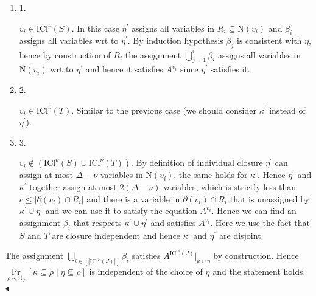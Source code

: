 \begin{enumerate}


\item[] 
1. 


$v_{i}\in\mathrm{ICl}^{\nu}\left(S\right)$. In this case $\eta^{\prime}$ assigns all variables in $R_{i}\subseteq\mathrm{N}\left(v_{i}\right)$ and $\beta_{i}$ assigns all variables wrt to $\eta^{\prime}$. By induction hypothesis
$\beta_{j}$ is consistent with $\eta$, hence by construction of $R_{i}$ the assignment
$\bigcup\limits_{j=1}^{i}\beta_{i}$ assigns all variables in $\mathrm{N}\left(v_{i}\right)$ wrt to $\eta^{\prime}$ and
hence it satisfies $A^{v_{i}}$ since $\eta^{\prime}$ satisfies it.\par





\item[] 
2. 


$v_{i}\in\mathrm{ICl}^{\nu}\left(T\right)$. Similar to the previous case (we should consider $\kappa^{\prime}$
instead of $\eta^{\prime}$).\par





\item[] 
3. 


$v_{i}\notin(\mathrm{ICl}^{\nu}\left(S\right)\cup\mathrm{ICl}^{\nu}\left(T%
\right))$. By definition of individual closure
$\eta^{\prime}$ can assign at most $\Delta-\nu$ variables in $\mathrm{N}\left(v_{i}\right)$, the same holds for
$\kappa^{\prime}$. Hence $\eta^{\prime}$ and $\kappa^{\prime}$ together assign at most $2(\Delta-\nu)$ variables,
which is strictly less than $c\leq|\partial(v_{i})\cap R_{i}|$ and there is a variable in $\partial(v_{i})\cap R_{i}$ that is unassigned
by $\kappa^{\prime}\cup\eta^{\prime}$ and we can use it to satisfy the equation $A^{v_{i}}$. Hence we can
find an assignment $\beta_{i}$ that respects $\kappa^{\prime}\cup\eta^{\prime}$ and satisfies $A^{v_{i}}$. Here
we use the fact that $S$ and $T$ are closure independent and hence $\kappa^{\prime}$ and $\eta^{\prime}$ are
disjoint.\par





\end{enumerate}


The assignment $\bigcup\limits_{i\in[|\mathrm{ICl}^{\nu}\left(J\right)|]}\beta_{i}$ satisfies
$A^{\mathrm{ICl}^{\nu}\left(J\right)}|_{\kappa\cup\eta}$ by construction. Hence
$\Pr\limits_{\rho\sim\mathfrak{U}_{J}}[\kappa\subseteq\rho\mid\eta\subseteq\rho]$ is independent of the choice of $\eta$ and the statement holds.
$\blacktriangleleft$\par



